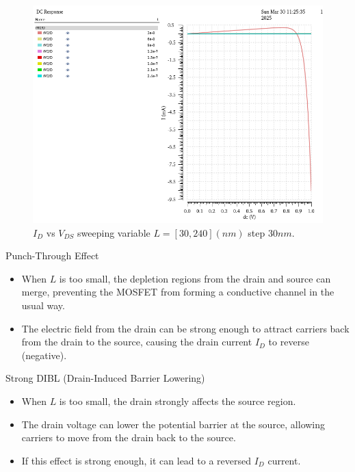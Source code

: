 
\begin{figure}[H]
	\centering
	\includegraphics[width = .6\linewidth]{sections/pic/EX2_NMOS_Id&Vds(Vgs(w)(l_30_240).png}
	\caption{$I_D$ vs $V_{DS}$ sweeping variable $L = [30, 240](nm)$ step $30nm$.}
	\label{f_EX2_NMOS_Id&Vds(Vgs(w)(l_30_240)}
\end{figure}

\begin{discussion}
	\item Punch-Through Effect
	\begin{itemize}[label=+]
		\item When \( L \) is too small, the depletion regions from the drain and source can merge, preventing the MOSFET from forming a conductive channel in the usual way.
		\item The electric field from the drain can be strong enough to attract carriers back from the drain to the source, causing the drain current \( I_{D} \) to reverse (negative).
	\end{itemize}
	
	\item Strong DIBL (Drain-Induced Barrier Lowering)
	\begin{itemize}[label=+]
		\item When \( L \) is too small, the drain strongly affects the source region.
		\item The drain voltage can lower the potential barrier at the source, allowing carriers to move from the drain back to the source.
		\item If this effect is strong enough, it can lead to a reversed \( I_{D} \) current.
	\end{itemize}
\end{discussion}

